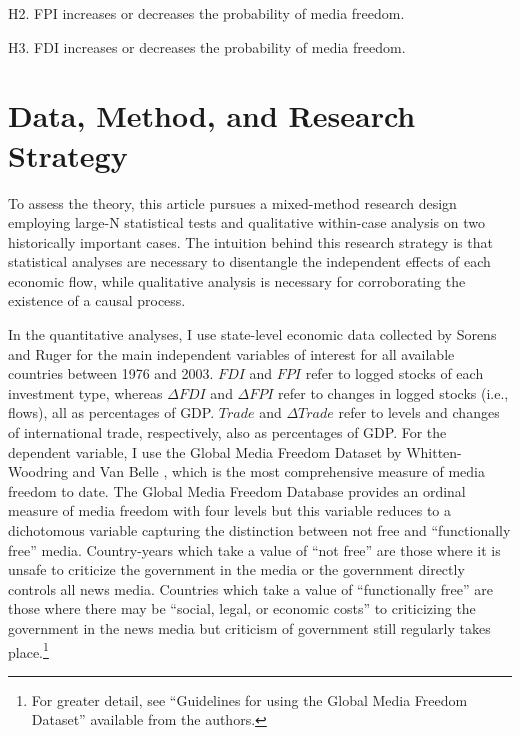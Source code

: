 \documentclass[12pt,a4paper]{article}\usepackage[]{graphicx}\usepackage[]{color}
\begin{document}
H2. FPI increases or decreases the probability of media freedom.

H3. FDI increases or decreases the probability of media freedom.


\section{Data, Method, and Research Strategy}

To assess the theory, this article pursues a mixed-method research design employing large-N statistical tests and qualitative within-case analysis on two historically important cases. The intuition behind this research strategy is that statistical analyses are necessary to disentangle the independent effects of each economic flow, while qualitative analysis is necessary for corroborating the existence of a causal process.

In the quantitative analyses, I use state-level economic data collected by Sorens and Ruger \parencite*{Sorens:wc} for the main independent variables of interest for all available countries between 1976 and 2003. $FDI$ and $FPI$ refer to logged stocks of each investment type, whereas $\Delta FDI$ and $\Delta FPI$ refer to changes in logged stocks (i.e., flows), all as percentages of GDP. $Trade$ and $\Delta Trade$ refer to levels and changes of international trade, respectively, also as percentages of GDP.   For the dependent variable, I use the Global Media Freedom Dataset by Whitten-Woodring and Van Belle \parencites*{van2000press}{Belle:1997wo}, which is the most comprehensive measure of media freedom to date. The Global Media Freedom Database provides an ordinal measure of media freedom with four levels but this variable reduces to a dichotomous variable capturing the distinction between not free and ``functionally free'' media. Country-years which take a value of ``not free'' are those where it is unsafe to criticize the government in the media or the government directly controls all news media. Countries which take a value of ``functionally free'' are those where there may be ``social, legal, or economic costs'' to criticizing the government in the news media but criticism of government still regularly takes place.\footnote{For greater detail, see ``Guidelines for using the Global Media Freedom Dataset'' available from the authors.}
\end{document}
